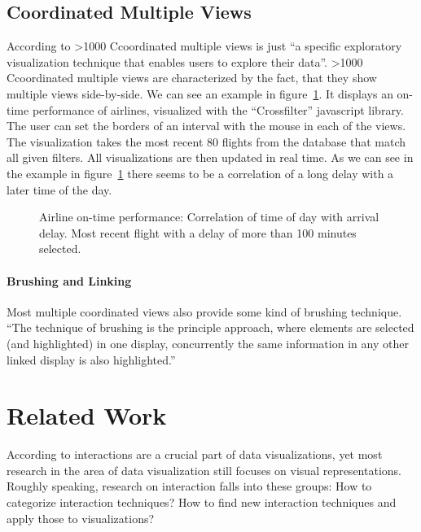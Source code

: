 \documentclass{article}
\newcommand\hmm[1]{\ifnum\ifhmode\spacefactor\else2000\fi>1000 \uppercase{#1}\else#1\fi}
\newcommand{\cmvs}{\hmm{c}oordinated multiple views}
\begin{document}
\subsection{Coordinated Multiple Views}
According to \textcite{Roberts2007} \cmvs{} is just ``a specific exploratory visualization technique that enables users to explore their data''.
\cmvs{} are characterized by the fact, that they show multiple views side-by-side.
We can see an example in figure~\ref{fig:research:cmv}.
It displays an on-time performance of airlines, visualized with the ``Crossfilter'' javascript library.
The user can set the borders of an interval with the mouse in each of the views.
The visualization takes the most recent 80 flights from the database that match all given filters.
All visualizations are then updated in real time.
As we can see in the example in figure~\ref{fig:research:cmv} there seems to be a correlation of a long delay with a later time of the day.

\begin{figure}[h]
  \centering
  \caption{Airline on-time performance: Correlation of time of day with arrival delay. Most recent flight with a delay of more than 100 minutes selected.}\label{fig:research:cmv}
\end{figure}

\paragraph{Brushing and Linking}
Most multiple coordinated views also provide some kind of brushing technique.
``The technique of brushing is the principle approach, where elements are selected (and highlighted) in one display, concurrently the same information in any other linked display is also highlighted.''\cite{Roberts2007}

\clearpage
\section{Related Work}\label{sec:related-work}
According to \textcite{Ho2013} interactions are a crucial part of data visualizations, yet most research in the area of data visualization still focuses on visual representations.
Roughly speaking, research on interaction falls into these groups:
How to categorize interaction techniques?
How to find new interaction techniques and apply those to visualizations?
\end{document}
